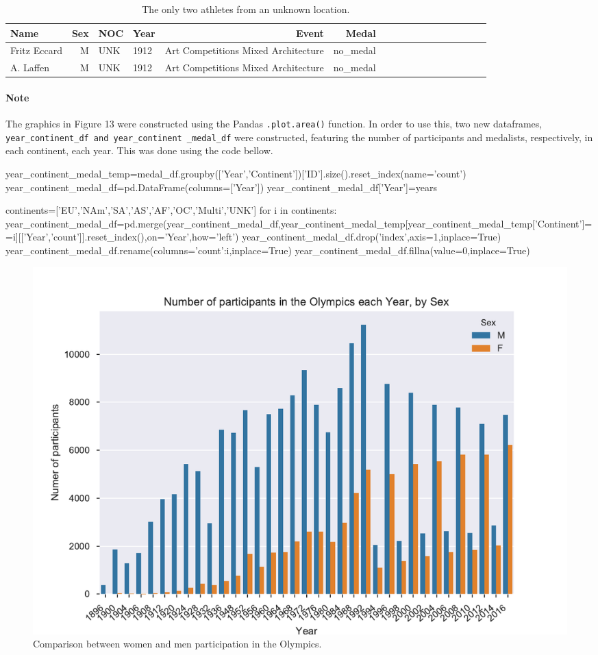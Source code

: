 \documentclass[11pt]{article} %
\begin{document}
\begin{table}
\centering
\begin{tabular}{lrllrrrllrlllllll}
\toprule
Name & Sex &       NOC &  Year &     Event &     Medal &  \\
\midrule
Fritz Eccard &   M &     UNK &  1912 &       Art Competitions Mixed Architecture &  no\_medal    \\
A. Laffen &   M &     UNK &  1912 &       Art Competitions Mixed Architecture &  no\_medal  \\
\bottomrule
\end{tabular}
\caption{The only two athletes from an unknown location.}
\end{table}

\paragraph{Note} The graphics in Figure 13 were constructed using the Pandas {\tt .plot.area()} function. In order to use this, two new dataframes, {\tt year\_continent\_df and year\_continent \_medal\_df} were constructed, featuring the number of participants and medalists, respectively, in each continent, each year. This was done using the code bellow.


\begin{python}
year_continent_medal_temp=medal_df.groupby(['Year','Continent'])['ID'].size().reset_index(name='count')
year_continent_medal_df=pd.DataFrame(columns=['Year'])
year_continent_medal_df['Year']=years


continents=['EU','NAm','SA','AS','AF','OC','Multi','UNK']
for i in continents: 
    year_continent_medal_df=pd.merge(year_continent_medal_df,year_continent_medal_temp[year_continent_medal_temp['Continent']==i][['Year','count']].reset_index(),on='Year',how='left')
    year_continent_medal_df.drop('index',axis=1,inplace=True)
    year_continent_medal_df.rename(columns={'count':i},inplace=True)
year_continent_medal_df.fillna(value=0,inplace=True)
\end{python}



\begin{figure}
    \centering
    \includegraphics[scale=0.6]{Participants_year_sex.pdf}
    \caption{Comparison between women and men participation in the Olympics.}
\end{figure}
\end{document}
